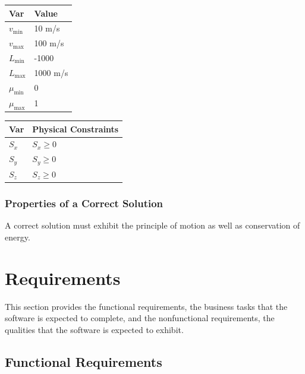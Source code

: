 \documentclass[12pt]{article}
\begin{document}
\noindent 

\begin{table}[!h]
\caption{Specification Parameter Values} \label{TblSpecParams}
\renewcommand{\arraystretch}{1.2}
\noindent \begin{longtable*}{l l} 
  \toprule
  \textbf{Var} & \textbf{Value} \\
  \midrule 
  $v_\text{min}$ & 10 m/s\\
  $v_\text{max}$ & 100 m/s\\
  $L_\text{min}$ & -1000\\
  $L_\text{max}$ & 1000 m/s\\
  $\mu_\text{min}$ & 0\\
  $\mu_\text{max}$ & 1\\
  \bottomrule
\end{longtable*}
\end{table}

\begin{table}[!h]
\caption{Output Variables} \label{TblOutputVar}
\renewcommand{\arraystretch}{1.2}
\noindent \begin{longtable*}{l l} 
  \toprule
  \textbf{Var} & \textbf{Physical Constraints} \\
  \midrule 
  $S_{x}$ & $S_{x} \geq 0$
  \\
  $S_{y}$ & $S_{y} \geq 0$
  \\
  $S_{z}$ & $S_{z} \geq 0$
  \\
  \bottomrule
\end{longtable*}
\end{table}

\subsubsection{Properties of a Correct Solution} \label{sec_CorrectSolution}

\noindent
A correct solution must exhibit the principle of motion as well as conservation of energy.

\section{Requirements}

This section provides the functional requirements, the business tasks that the
software is expected to complete, and the nonfunctional requirements, the
qualities that the software is expected to exhibit.

\subsection{Functional Requirements}
\end{document}
